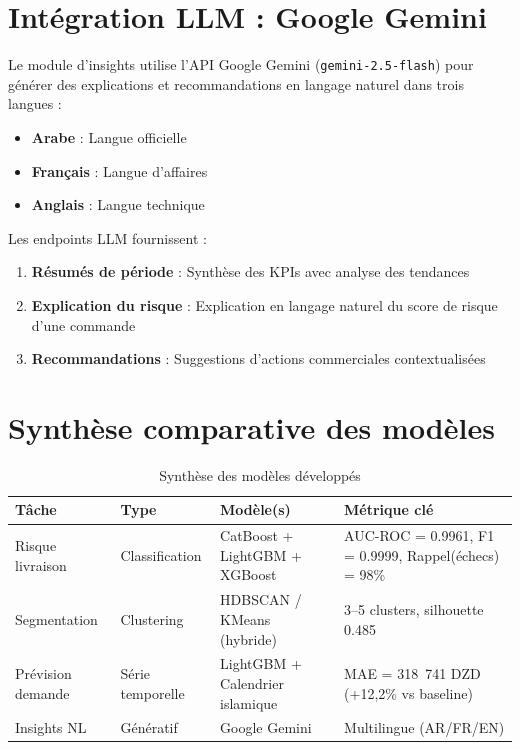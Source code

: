 \documentclass[12pt,a4paper]{report}
\begin{document}
\section{Int\'{e}gration LLM : Google Gemini}

Le module d'insights utilise l'API Google Gemini (\texttt{gemini-2.5-flash}) pour g\'{e}n\'{e}rer des explications et recommandations en langage naturel dans trois langues :

\begin{itemize}
  \item \textbf{Arabe} : Langue officielle
  \item \textbf{Fran\c{c}ais} : Langue d'affaires
  \item \textbf{Anglais} : Langue technique
\end{itemize}

Les endpoints LLM fournissent :
\begin{enumerate}
  \item \textbf{R\'{e}sum\'{e}s de p\'{e}riode} : Synth\`{e}se des KPIs avec analyse des tendances
  \item \textbf{Explication du risque} : Explication en langage naturel du score de risque d'une commande
  \item \textbf{Recommandations} : Suggestions d'actions commerciales contextualis\'{e}es
\end{enumerate}

\section{Synth\`{e}se comparative des mod\`{e}les}

\begin{table}[H]
\centering
\caption{Synth\`{e}se des mod\`{e}les d\'{e}velopp\'{e}s}
\label{tab:synthesis}
\begin{tabularx}{\textwidth}{l l l X}
\toprule
\textbf{T\^{a}che} & \textbf{Type} & \textbf{Mod\`{e}le(s)} & \textbf{M\'{e}trique cl\'{e}} \\
\midrule
Risque livraison & Classification & CatBoost + LightGBM + XGBoost & AUC-ROC = 0.9961, F1 = 0.9999, Rappel(\'echecs) = 98\% \\
Segmentation & Clustering & HDBSCAN / KMeans (hybride) & 3--5 clusters, silhouette 0.485 \\
Pr\'{e}vision demande & S\'{e}rie temporelle & LightGBM + Calendrier islamique & MAE = 318~741 DZD (+12,2\% vs baseline) \\
Insights NL & G\'{e}n\'{e}ratif & Google Gemini & Multilingue (AR/FR/EN) \\
\bottomrule
\end{tabularx}
\end{table}
\end{document}
